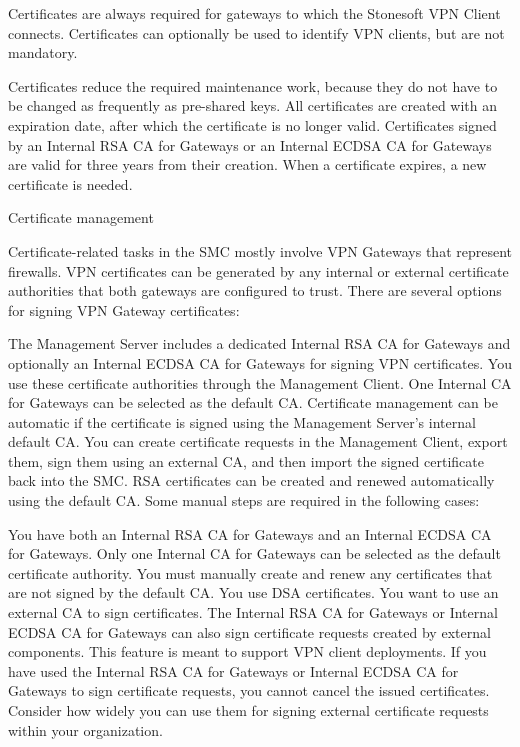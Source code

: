 Certificates are always required for gateways to which the Stonesoft VPN Client connects. Certificates can optionally be used to identify VPN clients, but are not mandatory.

Certificates reduce the required maintenance work, because they do not have to be changed as frequently as pre-shared keys. All certificates are created with an expiration date, after which the certificate is no longer valid. Certificates signed by an Internal RSA CA for Gateways or an Internal ECDSA CA for Gateways are valid for three years from their creation. When a certificate expires, a new certificate is needed.

Certificate management

Certificate-related tasks in the SMC mostly involve VPN Gateways that represent firewalls. VPN certificates can be generated by any internal or external certificate authorities that both gateways are configured to trust. There are several options for signing VPN Gateway certificates:

The Management Server includes a dedicated Internal RSA CA for Gateways and optionally an Internal ECDSA CA for Gateways for signing VPN certificates. You use these certificate authorities through the Management Client.
One Internal CA for Gateways can be selected as the default CA. Certificate management can be automatic if the certificate is signed using the Management Server's internal default CA.
You can create certificate requests in the Management Client, export them, sign them using an external CA, and then import the signed certificate back into the SMC.
RSA certificates can be created and renewed automatically using the default CA. Some manual steps are required in the following cases:

You have both an Internal RSA CA for Gateways and an Internal ECDSA CA for Gateways. Only one Internal CA for Gateways can be selected as the default certificate authority. You must manually create and renew any certificates that are not signed by the default CA.
You use DSA certificates.
You want to use an external CA to sign certificates.
The Internal RSA CA for Gateways or Internal ECDSA CA for Gateways can also sign certificate requests created by external components. This feature is meant to support VPN client deployments. If you have used the Internal RSA CA for Gateways or Internal ECDSA CA for Gateways to sign certificate requests, you cannot cancel the issued certificates. Consider how widely you can use them for signing external certificate requests within your organization.

